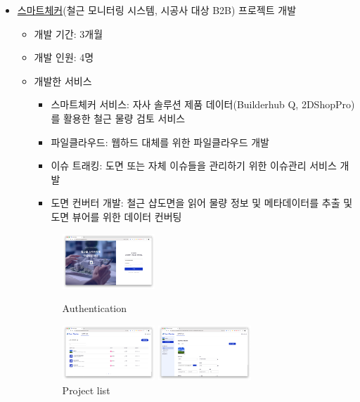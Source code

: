 \begin{itemize}
	\item \href{https://check.builderhub.io/signin}{스마트체커}(철근 모니터링 시스템, 시공사 대상 B2B) 프로젝트 개발
	      \begin{itemize}[label=$\star$]
		      \item 개발 기간: 3개월
		      \item 개발 인원: 4명
		      \item 개발한 서비스
		            \begin{itemize}
			            \item 스마트체커 서비스: 자사 솔루션 제품 데이터(Builderhub Q, 2DShopPro)를 활용한 철근 물량 검토 서비스
			            \item 파일클라우드: 웹하드 대체를 위한 파일클라우드 개발
			            \item 이슈 트래킹: 도면 또는 자체 이슈들을 관리하기 위한 이슈관리 서비스 개발
			            \item 도면 컨버터 개발: 철근 샵도면을 읽어 물량 정보 및 메타데이터를 추출 및 도면 뷰어를 위한 데이터 컨버팅
		            \end{itemize}
		            \begin{figure}[!ht]
			            \begin{fullwidth}
				            \parbox{0.35\textwidth}{
					            \centering
					            \includegraphics[width=0.35\textwidth]{images/smart-checker-auth.png}
					            \caption*{Authentication}
				            }\qquad
				            \parbox{0.35\textwidth}{
					            \centering
					            \includegraphics[width=0.35\textwidth]{images/smart-checker-project-list.png}
					            \caption*{Project list}
				            }\qquad
				            \parbox{0.35\textwidth}{
					            \centering
					            \includegraphics[width=0.35\textwidth]{images/smart-checker-project-info.png}
}
\end{fullwidth}
\end{figure}
\end{itemize}
\end{itemize}
